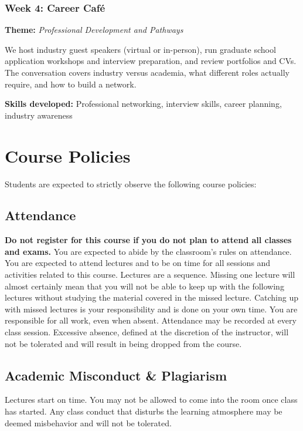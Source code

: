 \documentclass[10pt,a4paper,american]{exam}
\begin{document}
\subsubsection*{Week 4: Career Café}
\textbf{Theme:} \textit{Professional Development and Pathways}

We host industry guest speakers (virtual or in-person), run graduate school application workshops and interview preparation, and review portfolios and CVs. The conversation covers industry versus academia, what different roles actually require, and how to build a network.

\textbf{Skills developed:} Professional networking, interview skills, career planning, industry awareness

\section{Course Policies}
Students are expected to strictly observe the following course policies:

\subsection{Attendance}
\textbf{Do not register for this course if you do not plan to attend all classes and exams.} You are expected to abide by the classroom's rules on attendance. You are expected to attend lectures and to be on time for all sessions and activities related to this course. Lectures are a sequence. Missing one lecture will almost certainly mean that you will not be able to keep up with the following lectures without studying the material covered in the missed lecture. Catching up with missed lectures is your responsibility and is done on your own time. You are responsible for all work, even when absent. Attendance may be recorded at every class session. Excessive absence, defined at the discretion of the instructor, will not be tolerated and will result in being dropped from the course.

\subsection{Academic Misconduct \& Plagiarism}
Lectures start on time. You may not be allowed to come into the room once class has started. Any class conduct that disturbs the learning atmosphere may be deemed misbehavior and will not be tolerated.
\end{document}
